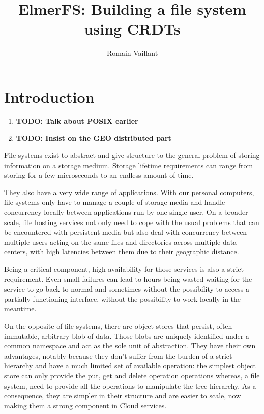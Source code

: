 \documentclass[sigplan, 10pt]{acmart}
\begin{document}
\author{Romain Vaillant}

\title{ElmerFS: Building a file system using CRDTs}

\begin{abstract}
\end{abstract}

\maketitle


\section{Introduction}

\begin{enumerate}
    \item\textbf{TODO: Talk about POSIX earlier}
    \item\textbf{TODO: Insist on the GEO distributed part}
\end{enumerate}

File systems exist to abstract and give structure to the general problem of
storing information on a storage medium. Storage lifetime requirements can range
from storing for a few microseconds to an endless amount of time.

They also have a very wide range of applications. With our personal computers,
file systems only have to manage a couple of storage media and handle
concurrency locally between applications run by one single user. On a broader scale, file hosting services not only need to cope
with the usual problems that can be encountered with persistent media but also
deal with concurrency between multiple users acting on the same files and
directories across multiple data centers, with high
latencies between them due to their geographic distance.

Being a critical component, high availability for those services is also
a strict requirement. Even small failures can lead to hours being wasted waiting
for the service to go back to normal and sometimes without the possibility to
access a partially functioning interface, without the possibility to work
locally in the meantime.

On the opposite of file systems, there are object stores that persist,
often immutable, arbitrary blob of data. Those blobs are uniquely identified
under a common namespace and act as the sole unit of abstraction.
They have their own advantages, notably because they don't suffer from the burden
of a strict hierarchy and have a much limited set of available operation:
the simplest object store can only provide the put, get and delete operation operations whereas,
a file system, need  to provide all the operations to manipulate the tree hierarchy.
As a consequence, they are simpler in their structure and are easier to scale,
now making them a strong component in Cloud services.
\end{document}
